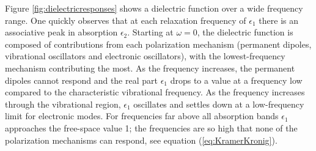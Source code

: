 Figure \ref{fig:dielectricresponses} shows a dielectric function over a wide frequency range. One quickly observes that at each relaxation frequency of $\epsilon_1$ there is an associative peak in absorption $\epsilon_2$. Starting at $\omega=0$, the dielectric function is composed of contributions from each polarization mechanism (permanent dipoles, vibrational oscillators and electronic oscillators), with the lowest-frequency mechanism contributing the most. As the frequency increases, the permanent dipoles cannot respond and the real part $\epsilon_1$ drops to a value at a frequency low compared to the characteristic vibrational frequency. As the frequency increases through the vibrational region, $\epsilon_1$ oscillates and settles down at a low-frequency limit for electronic modes. For frequencies far above all absorption bands $\epsilon_1$ approaches the free-space value 1; the frequencies are so high that none of the polarization mechanisms can respond, see equation (\ref{eq:KramerKronig})\cite{BH}.
    
    
    
    
